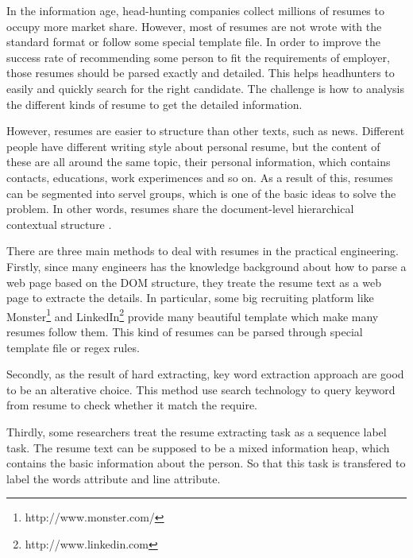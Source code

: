 \documentclass{acm_proc_article-sp}
\begin{document}
In the information age, head-hunting companies collect millions of resumes to occupy more market share.
However, most of resumes are not wrote with the standard format or follow some special template file.
In order to improve the success rate of recommending some person to fit the requirements of employer, those resumes should be parsed exactly and detailed.
This helps headhunters to easily and quickly search for the right candidate.
The challenge is how to analysis the different kinds of resume to get the detailed information.

However, resumes are easier to structure than other texts, such as news. 
Different people have different writing style about personal resume, but the content of these are all around the same topic, their personal information, which contains contacts, educations, work experimences and so on.
As a result of this, resumes can be segmented into servel groups, which is one of the basic ideas to solve the problem.
In other words, resumes share the document-level hierarchical contextual structure \cite{maheshwari2010approach}.

There are three main methods to deal with resumes in the practical engineering. 
Firstly, since many engineers has the knowledge background about how to parse a web page based on the DOM structure, they treate the resume text as a web page to extracte the details. 
In particular, some big recruiting platform like Monster\footnote{http://www.monster.com/} and LinkedIn\footnote{http://www.linkedin.com} provide many beautiful template which make many resumes follow them.
This kind of resumes can be parsed through special template file or regex rules.

Secondly, as the result of hard extracting, key word extraction approach are good to be an alterative choice.
This method use search technology to query keyword from resume to check whether it match the require.

Thirdly, some researchers treat the resume extracting task as a sequence label task.
The resume text can be supposed to be a mixed information heap, which contains the basic information about the person.
So that this task is transfered to label the words attribute and line attribute.
\end{document}
